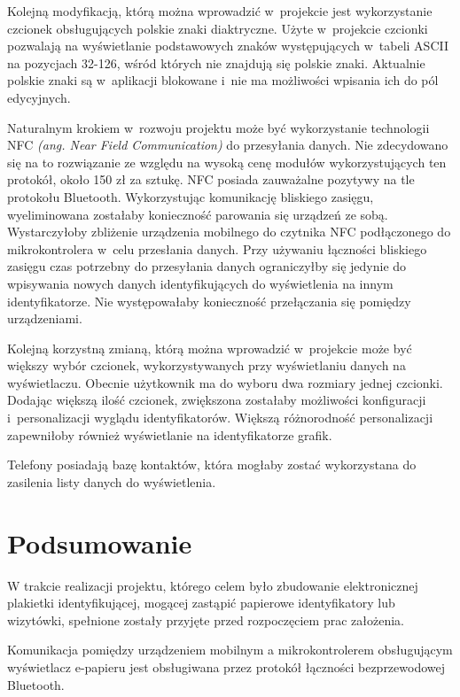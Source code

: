 \documentclass[a4paper,12pt, twoside]{article}
\begin{document}
        Kolejną modyfikacją, którą można wprowadzić w~projekcie jest wykorzystanie czcionek obsługujących polskie znaki diaktryczne. Użyte w~projekcie czcionki pozwalają na wyświetlanie podstawowych znaków występujących w~tabeli ASCII na pozycjach 32-126, wśród których nie znajdują się polskie znaki. Aktualnie polskie znaki są w~aplikacji blokowane i~nie ma możliwości wpisania ich do pól edycyjnych.
        
        Naturalnym krokiem w~rozwoju projektu może być wykorzystanie technologii NFC \textit{(ang. Near Field Communication)} do przesyłania danych. Nie zdecydowano się na to rozwiązanie ze względu na wysoką cenę modułów wykorzystujących ten protokół, około 150 zł za sztukę. NFC posiada zauważalne pozytywy na tle protokołu Bluetooth. Wykorzystując komunikację bliskiego zasięgu, wyeliminowana zostałaby konieczność parowania się urządzeń ze sobą. Wystarczyłoby zbliżenie urządzenia mobilnego do czytnika NFC podłączonego do mikrokontrolera w~celu przesłania danych. Przy używaniu łączności bliskiego zasięgu czas potrzebny do przesyłania danych ograniczyłby się jedynie do wpisywania nowych danych identyfikujących do wyświetlenia na innym identyfikatorze. Nie występowałaby konieczność przełączania się pomiędzy urządzeniami.
    	
    	Kolejną korzystną zmianą, którą można wprowadzić w~projekcie może być większy wybór czcionek, wykorzystywanych przy wyświetlaniu danych na wyświetlaczu. Obecnie użytkownik ma do wyboru dwa rozmiary jednej czcionki. Dodając większą ilość czcionek, zwiększona zostałaby możliwości konfiguracji i~personalizacji wyglądu identyfikatorów. Większą różnorodność personalizacji zapewniłoby również wyświetlanie na identyfikatorze grafik.
    	
    	Telefony posiadają bazę kontaktów, która mogłaby zostać wykorzystana do zasilenia listy danych do wyświetlenia.

    	\section{Podsumowanie}
    	W trakcie realizacji projektu, którego celem było zbudowanie elektronicznej plakietki identyfikującej, mogącej zastąpić papierowe identyfikatory lub wizytówki, spełnione zostały przyjęte przed rozpoczęciem prac założenia.
    	
    	Komunikacja pomiędzy urządzeniem mobilnym a mikrokontrolerem obsługującym wyświetlacz e-papieru jest obsługiwana przez protokół łączności bezprzewodowej Bluetooth.
    	
\end{document}
